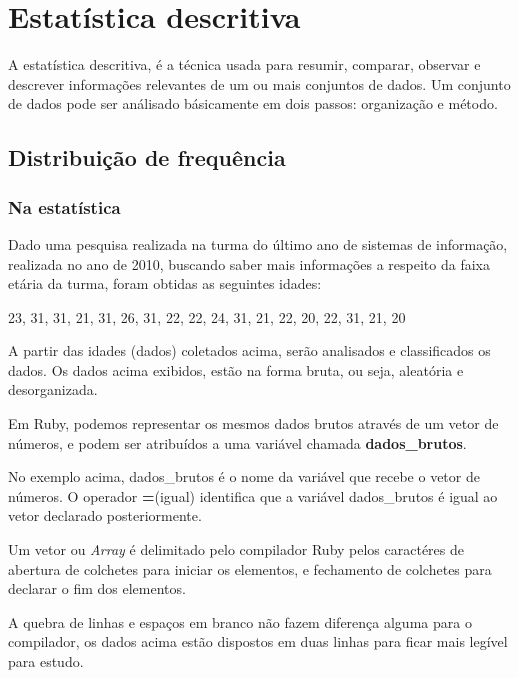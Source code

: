 \documentclass[espaco=simples,appendix=Name]{abnt}
\begin{document}
\chapter{Estatística descritiva}

A estatística descritiva, é a técnica usada para resumir, comparar, observar e descrever informações relevantes de um ou mais conjuntos de dados. Um conjunto de dados pode ser análisado básicamente em dois passos: organização e método.

\section{ Distribuição de frequência } 

\subsection { Na estatística }
Dado uma pesquisa realizada na turma do último ano de sistemas de informação, realizada no ano de 2010, buscando saber mais informações a respeito da faixa etária da turma, foram obtidas as seguintes idades:

23, 31, 31, 21, 31, 26, 31, 22, 22, 24, 31, 21, 22, 20, 22, 31, 21, 20

A partir das idades (dados) coletados acima, serão analisados e classificados os dados. Os dados acima exibidos, estão na forma bruta, ou seja, aleatória e desorganizada. 



Em Ruby, podemos representar os mesmos dados brutos através de um vetor de números, e podem ser atribuídos a uma variável chamada \textbf{dados\_brutos}.


 


No exemplo acima, dados\_brutos é o nome da variável que recebe o vetor de números. O operador \textbf{=}(igual) identifica que a variável dados\_brutos é igual ao vetor declarado posteriormente.

Um vetor ou \textit{Array} é delimitado pelo compilador Ruby pelos caractéres de abertura de colchetes para iniciar os elementos, e fechamento de colchetes para declarar o fim dos elementos.

A quebra de linhas e espaços em branco não fazem diferença alguma para o compilador, os dados acima estão dispostos em duas linhas para ficar mais legível para estudo.
\end{document}
